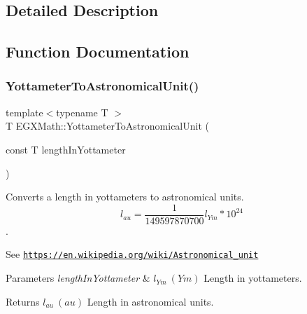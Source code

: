 \subsection{Detailed Description}


\subsection{Function Documentation}
\mbox{\label{group___e_g_x_math-_conversions-_length_conversions-_s_i-_yottameter-_astronomical_gab75681ecd108900ae547e58495a62dd3}} 
\subsubsection{\texorpdfstring{Yottameter\+To\+Astronomical\+Unit()}{YottameterToAstronomicalUnit()}}
{\footnotesize\ttfamily template$<$typename T $>$ \\
T E\+G\+X\+Math\+::\+Yottameter\+To\+Astronomical\+Unit (\begin{DoxyParamCaption}\item[{const T}]{length\+In\+Yottameter }\end{DoxyParamCaption})}



Converts a length in yottameters to astronomical units. \[ l_{au}= \frac{1}{149597870700} l_{Ym} * 10^{24} \]. 

See \href{https://en.wikipedia.org/wiki/Astronomical_unit}{\tt https\+://en.\+wikipedia.\+org/wiki/\+Astronomical\+\_\+unit} 
\begin{DoxyParams}{Parameters}
{\em length\+In\+Yottameter} & $ l_{Ym}\ (Ym)$ Length in yottameters. \\
\hline
\end{DoxyParams}
\begin{DoxyReturn}{Returns}
$ l_{au}\ (au)$ Length in astronomical units. 
\end{DoxyReturn}
\mbox{\label{group___e_g_x_math-_conversions-_length_conversions-_s_i-_yottameter-_astronomical_ga0ab87688c8dea9fb838a3bca34cba82c}} 
